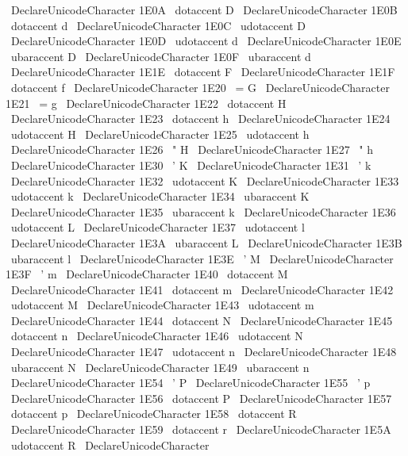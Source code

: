 {{{{{{{}
}
%
\
DeclareUnicodeCharacter
{
1E0A
}
{
\
dotaccent
{
D
}
}
%
\
DeclareUnicodeCharacter
{
1E0B
}
{
\
dotaccent
{
d
}
}
%
\
DeclareUnicodeCharacter
{
1E0C
}
{
\
udotaccent
{
D
}
}
%
\
DeclareUnicodeCharacter
{
1E0D
}
{
\
udotaccent
{
d
}
}
%
\
DeclareUnicodeCharacter
{
1E0E
}
{
\
ubaraccent
{
D
}
}
%
\
DeclareUnicodeCharacter
{
1E0F
}
{
\
ubaraccent
{
d
}
}
%
%
\
DeclareUnicodeCharacter
{
1E1E
}
{
\
dotaccent
{
F
}
}
%
\
DeclareUnicodeCharacter
{
1E1F
}
{
\
dotaccent
{
f
}
}
%
%
\
DeclareUnicodeCharacter
{
1E20
}
{
\
=
G
}
%
\
DeclareUnicodeCharacter
{
1E21
}
{
\
=
g
}
%
\
DeclareUnicodeCharacter
{
1E22
}
{
\
dotaccent
{
H
}
}
%
\
DeclareUnicodeCharacter
{
1E23
}
{
\
dotaccent
{
h
}
}
%
\
DeclareUnicodeCharacter
{
1E24
}
{
\
udotaccent
{
H
}
}
%
\
DeclareUnicodeCharacter
{
1E25
}
{
\
udotaccent
{
h
}
}
%
\
DeclareUnicodeCharacter
{
1E26
}
{
\
"
H
}
%
\
DeclareUnicodeCharacter
{
1E27
}
{
\
"
h
}
%
%
\
DeclareUnicodeCharacter
{
1E30
}
{
\
'
K
}
%
\
DeclareUnicodeCharacter
{
1E31
}
{
\
'
k
}
%
\
DeclareUnicodeCharacter
{
1E32
}
{
\
udotaccent
{
K
}
}
%
\
DeclareUnicodeCharacter
{
1E33
}
{
\
udotaccent
{
k
}
}
%
\
DeclareUnicodeCharacter
{
1E34
}
{
\
ubaraccent
{
K
}
}
%
\
DeclareUnicodeCharacter
{
1E35
}
{
\
ubaraccent
{
k
}
}
%
\
DeclareUnicodeCharacter
{
1E36
}
{
\
udotaccent
{
L
}
}
%
\
DeclareUnicodeCharacter
{
1E37
}
{
\
udotaccent
{
l
}
}
%
\
DeclareUnicodeCharacter
{
1E3A
}
{
\
ubaraccent
{
L
}
}
%
\
DeclareUnicodeCharacter
{
1E3B
}
{
\
ubaraccent
{
l
}
}
%
\
DeclareUnicodeCharacter
{
1E3E
}
{
\
'
M
}
%
\
DeclareUnicodeCharacter
{
1E3F
}
{
\
'
m
}
%
%
\
DeclareUnicodeCharacter
{
1E40
}
{
\
dotaccent
{
M
}
}
%
\
DeclareUnicodeCharacter
{
1E41
}
{
\
dotaccent
{
m
}
}
%
\
DeclareUnicodeCharacter
{
1E42
}
{
\
udotaccent
{
M
}
}
%
\
DeclareUnicodeCharacter
{
1E43
}
{
\
udotaccent
{
m
}
}
%
\
DeclareUnicodeCharacter
{
1E44
}
{
\
dotaccent
{
N
}
}
%
\
DeclareUnicodeCharacter
{
1E45
}
{
\
dotaccent
{
n
}
}
%
\
DeclareUnicodeCharacter
{
1E46
}
{
\
udotaccent
{
N
}
}
%
\
DeclareUnicodeCharacter
{
1E47
}
{
\
udotaccent
{
n
}
}
%
\
DeclareUnicodeCharacter
{
1E48
}
{
\
ubaraccent
{
N
}
}
%
\
DeclareUnicodeCharacter
{
1E49
}
{
\
ubaraccent
{
n
}
}
%
%
\
DeclareUnicodeCharacter
{
1E54
}
{
\
'
P
}
%
\
DeclareUnicodeCharacter
{
1E55
}
{
\
'
p
}
%
\
DeclareUnicodeCharacter
{
1E56
}
{
\
dotaccent
{
P
}
}
%
\
DeclareUnicodeCharacter
{
1E57
}
{
\
dotaccent
{
p
}
}
%
\
DeclareUnicodeCharacter
{
1E58
}
{
\
dotaccent
{
R
}
}
%
\
DeclareUnicodeCharacter
{
1E59
}
{
\
dotaccent
{
r
}
}
%
\
DeclareUnicodeCharacter
{
1E5A
}
{
\
udotaccent
{
R
}
}
%
\
DeclareUnicodeCharacter
{
}}}}}}
